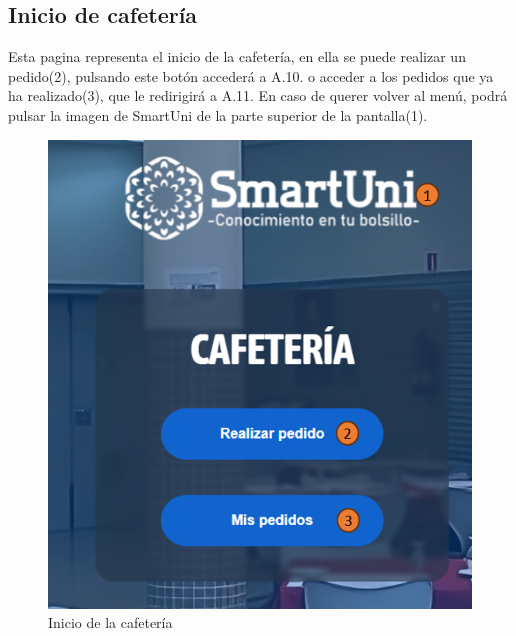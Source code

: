 \documentclass[12pt]{report}
\begin{document}
\begin{appendices}
\section{Inicio de cafetería}
Esta pagina representa el inicio de la cafetería, en ella se puede realizar un pedido(2), pulsando este botón accederá a A.10. o acceder a los pedidos que ya ha realizado(3), que le redirigirá a A.11. En caso de querer volver al menú, podrá pulsar la imagen de SmartUni de la parte superior de la pantalla(1).\\
\begin{figure}[H]
    \centering
    \includegraphics[scale = 0.7]{imagenes//manual_de_usuario/9.png}
    \caption{Inicio de la cafetería}
    \label{fig:enter-label}
\end{figure}
\newpage

\end{appendices}
\end{document}
